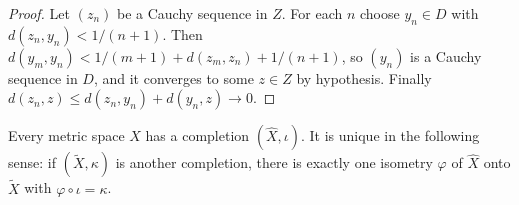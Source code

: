 \begin{proof}
Let $(z_n)$ be a Cauchy sequence in $Z$. For each $n$ choose $y_n\in D$ with $d(z_n,y_n)<1/(n+1)$. Then $d(y_m,y_n)<1/(m+1)+d(z_m,z_n)+1/(n+1)$, so $(y_n)$ is a Cauchy sequence in $D$, and it converges to some $z\in Z$ by hypothesis. Finally $d(z_n,z)\le d(z_n,y_n)+d(y_n,z)\to0$.
\end{proof}

\begin{theorem}
\label{thm:completion}
Every metric space $X$ has a completion $(\hat X,\iota)$. It is unique in the following sense: if $(\tilde X,\kappa)$ is another completion, there is exactly one isometry $\varphi$ of $\hat X$ onto $\tilde X$ with $\varphi\circ\iota=\kappa$.
\end{theorem}

